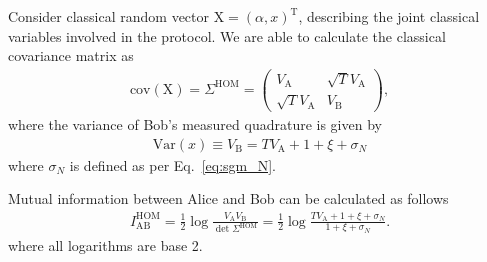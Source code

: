 \documentclass[%
reprint,
superscriptaddress,
 amsmath,amssymb,amsfonts,
 aps,
 pra,
 longbibliography
]{revtex4-2}
\newcommand{\ind}[1]{\mathrm{#1}}
\begin{document}
Consider classical random vector $\boldsymbol{\ind{X}}=\left(\alpha, x\right)^{\ind{T}}$, describing the joint classical variables involved in the protocol. We are able to calculate the classical covariance matrix as
\begin{align}
  \label{eq:S_qp_hom}
    \ind{cov}\left(\boldsymbol{\ind{X}}\right)=\Sigma^{\ind{HOM}}=\begin{pmatrix}
        V_{\ind{A}}&\sqrt TV_{\ind{A}}\\
        \sqrt TV_{\ind{A}}&V_{\ind{B}}
    \end{pmatrix},
\end{align}
where the variance of Bob’s measured quadrature is given by
\begin{align}
  \label{eq:vb}
  \ind{Var}(x)\equiv V_{\ind{B}} = TV_{\ind{A}}+1+\xi+\sigma_N%
\end{align}
where $\sigma_N$ is defined as per Eq.~\eqref{eq:sgm_N}. %

Mutual information between Alice and Bob can be calculated as follows~\cite{SochEtAl2024_StatProofBook}
\begin{align}
\label{eq:IABPM}
    I_{\ind{AB}}^{\ind{HOM}}=\frac{1}{2}\log \frac{V_{\ind{A}}V_{\ind{B}}}
    {\det\Sigma^{\ind{HOM}}}=\frac{1}{2}\log \frac{TV_{\ind{A}}+1+\xi+\sigma_N}
    {1+\xi+\sigma_N}.
\end{align}
where all logarithms are base 2.
\end{document}
